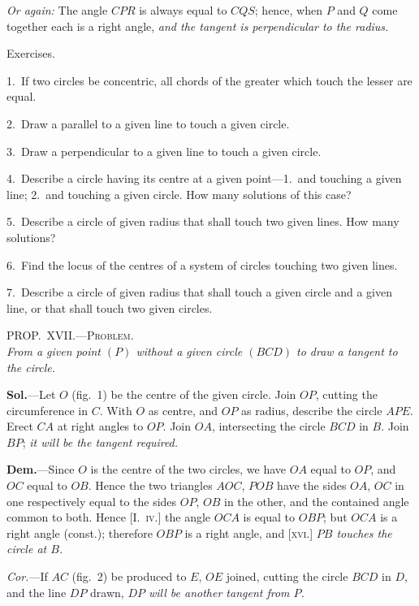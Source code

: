 \documentclass[oneside]{book}
\newcommand\myprop[2]{
\bigskip\Needspace*{4\baselineskip}\begin{center}\textsc{#1}\\\medskip\emph{#2}\par\end{center}
}
\newcommand\exhead[1]{
\Needspace*{5\baselineskip}\begin{center}
\textsf{#1}
\end{center}
}
\newcommand\imgcent[2]{
\begin{center}

\end{center}
}
\begin{document}
\textit{Or again:} The angle $CPR$ is always equal to $CQS$;
hence, when $P$ and $Q$ come together each is a right
angle, \textit{and the tangent is perpendicular to the radius.}

\exhead{Exercises.}

\begin{footnotesize}
1.~If two circles be concentric, all chords of the greater which
touch the lesser are equal.

2.~Draw a parallel to a given line to touch a given circle.

3.~Draw a perpendicular to a given line to touch a given
circle.

4.~Describe a circle having its centre at a given point---1.~and
touching a given line; 2.~and touching a given circle. How
many solutions of this case?

5.~Describe a circle of given radius that shall touch two given
lines. How many solutions?

6.~Find the locus of the centres of a system of circles touching
two given lines.

7.~Describe a circle of given radius that shall touch a given
circle and a given line, or that shall touch two given circles.
\par\end{footnotesize}


\myprop{PROP\@.~XVII\@.---Problem.}{From a given point $(P)$ without a given circle $(BCD)$ to
draw a tangent to the circle.}


\imgcent{295}{f123}

\textbf{Sol.}---Let $O$ (fig.~1) be the centre of the given circle.
Join $OP$, cutting the circumference in $C$. With $O$ as
centre, and $OP$ as radius, describe the circle $APE$.
Erect $CA$ at right angles to $OP$. Join $OA$, intersecting
the circle $BCD$ in $B$. Join $BP$; \emph{it will be the
tangent required.}

\textbf{Dem.}---Since $O$ is the centre of the two circles,
we have $OA$ equal to $OP$, and $OC$ equal to $OB$.
Hence the two triangles $AOC$, $POB$ have the sides
$OA$, $OC$ in one respectively equal to the sides $OP$, $OB$
in the other, and the contained angle common to both.
Hence [I.~\textsc{iv.}] the angle $OCA$ is equal to $OBP$; but
$OCA$ is a right angle (const.); therefore $OBP$ is a
right angle, and [\textsc{xvi.}] \emph{$PB$ touches the circle at $B$.}

\emph{Cor.}---If $AC$ (fig.~2) be produced to $E$, $OE$ joined,
cutting the circle $BCD$ in $D$, and the line $DP$ drawn,
\emph{$DP$ will be another tangent from $P$.}
\end{document}

